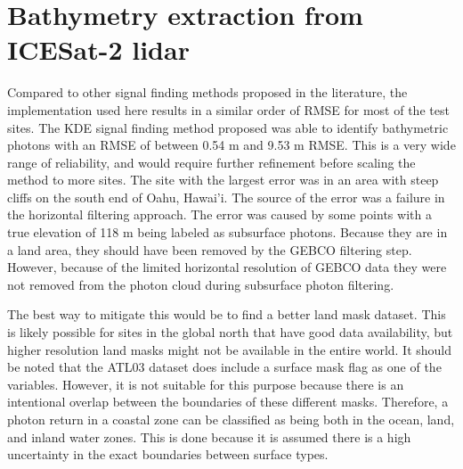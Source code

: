 

\section{Bathymetry extraction from ICESat-2 lidar}

Compared to other signal finding methods proposed in the literature, the implementation used here results in a similar order of RMSE for most of the test sites. The KDE signal finding method proposed was able to identify bathymetric photons with an RMSE of between 0.54 m and 9.53 m RMSE. This is a very wide range of reliability, and would require further refinement before scaling the method to more sites. The site with the largest error was in an area with steep cliffs on the south end of Oahu, Hawai'i. The source of the error was a failure in the horizontal filtering approach. The error was caused by some points with a true elevation of 118 m being labeled as subsurface photons. Because they are in a land area, they should have been removed by the GEBCO filtering step. However, because of the limited horizontal resolution of GEBCO data they were not removed from the photon cloud during subsurface photon filtering.

The best way to mitigate this would be to find a better land mask dataset. This is likely possible for sites in the global north that have good data availability, but higher resolution land masks might not be available in the entire world. It should be noted that the ATL03 dataset does include a surface mask flag as one of the variables. However, it is not suitable for this purpose because there is an intentional overlap between the boundaries of these different masks. Therefore, a photon return in a coastal zone can be classified as being both in the ocean, land, and inland water zones. This is done because it is assumed there is a high uncertainty in the exact boundaries between surface types. 


